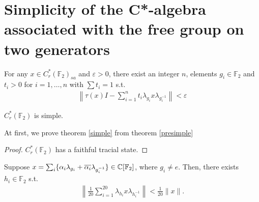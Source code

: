 \section{Simplicity of the C*-algebra associated with the free group on two generators}
\cite{powers1975simplicity}
\begin{theorem}\label{presimple}
  For any $x \in C_r^*(\mathbb{F}_2)_{sa}$ and $\varepsilon > 0$,
  there exist an integer $n$,
  elements $g_i \in \mathbb{F}_2$ and $t_i > 0$ for $i = 1, \ldots, n$ with $\sum t_i = 1$
  s.t.
  \begin{align*}
    \left\| \tau (x) I - \sum_{i=1}^n t_i \lambda_{g_i} x \lambda_{g_i^{-1}} \right\| < \varepsilon
  \end{align*}
\end{theorem}

\begin{theorem}\label{simple}
  $C_r^*(\mathbb{F}_2)$ is simple.
\end{theorem}

At first, we prove theorem \ref{simple} from theorem \ref{presimple}

\begin{proof}
  $C_r^*(\mathbb{F}_2)$ has a faithful tracial state.
\end{proof}

\begin{lemma}
  Suppose $x = \sum_i \{\alpha_i \lambda_{g_i} + \overline{\alpha_i} \lambda_{g_i^{-1}}\} \in \mathbb{C} [\mathbb{F}_2]$,
  where $g_i \neq e$.
  Then, there exists $h_i \in \mathbb{F}_2$ s.t.
  \begin{align*}
    \left\| \frac{1}{20} \sum_{i=1}^{20} \lambda_{h_i} x \lambda_{h_i^{-1}} \right\| < \frac{1}{20} \|x\|.
  \end{align*}
\end{lemma}

